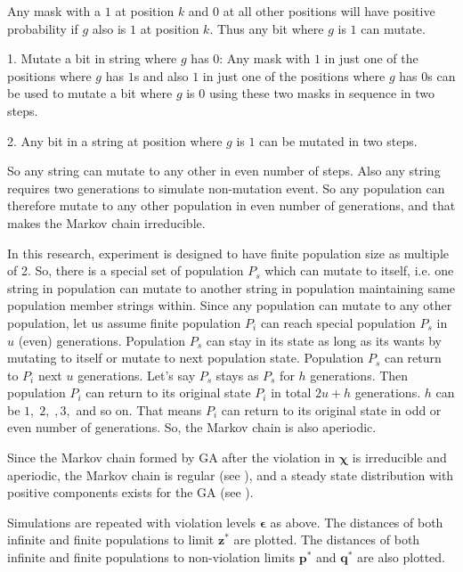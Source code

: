 Any mask with a $1$ at position $k$ and $0$ at all other positions  
will have positive probability if $g$ also is $1$ at position $k$. 
Thus any bit where $g$ is $1$ can mutate. 

1. Mutate a bit in string where $g$ has $0$: 
Any mask with $1$ in just one of the positions where $g$ has $1$s and 
also $1$ in just one of the positions where $g$ has $0$s can be used to 
mutate a bit where $g$ is $0$ using these two masks in sequence in two steps. 

2.
Any bit in a string at position where $g$ 
is $1$ can be mutated in two steps. 

So any string can mutate to any other in even number of steps. 
Also any string requires two generations to simulate non-mutation event.
So any population can therefore mutate to any other population in even number of generations, 
and that makes the Markov chain irreducible.

In this research, experiment is designed to have finite population size as multiple of 2. 
So, there is a special set of population $P_s$ which can mutate to itself, i.e. one string in 
population can mutate to another string in population maintaining same population member strings within. 
Since any population can mutate to any other population, let us assume finite population $P_i$ 
can reach special population $P_s$ in $u$ (even) generations. Population $P_s$ can stay in its state as long as its wants 
by mutating to itself or mutate to next population state. Population $P_s$ can return to $P_i$ next $u$ generations. 
Let's say $P_s$ stays as $P_s$ for $h$ generations. Then population $P_i$ can return to its original state $P_i$ 
in total $2u+h$ generations. $h$ can be $1, \; 2, \;, 3,$ and so on. That means $P_i$ can return to its original state in 
odd or even number of generations. So, the Markov chain is also aperiodic.

Since the Markov chain formed by GA after the violation in $\bm{\chi}$ is irreducible and aperiodic, 
the Markov chain is regular (see \cite{Iosifescu1980}), and a steady state distribution 
with positive components exists for the GA (see \cite{Minc1988}). 

Simulations are repeated with violation levels $\bm{\epsilon}$ as above.
The distances of both infinite and finite populations to limit $\bm{z}^\ast$ are plotted. 
The distances of both infinite and finite populations to non-violation limits $\bm{p}^\ast$ and $\bm{q}^\ast$ are also plotted.

